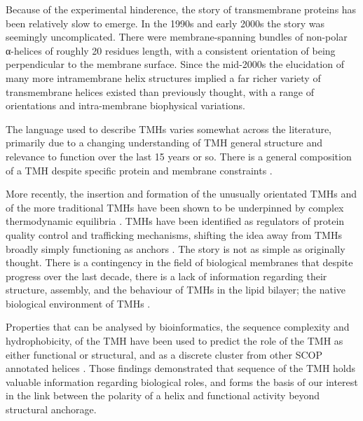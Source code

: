 \documentclass[12pt,PhD,twoside]{muthesis}
\begin{document}
Because of the experimental hinderence, the story of transmembrane proteins has been relatively slow to emerge. In the 1990s and early 2000s the story was seemingly uncomplicated. There were membrane-spanning bundles of non-polar α-helices of roughly 20 residues length, with a consistent orientation of being perpendicular to the membrane surface. Since the mid-2000s the elucidation of many more intramembrane helix structures implied a far richer variety of transmembrane helices existed than previously thought, with a range of orientations and intra-membrane biophysical variations.

The language used to describe TMHs varies somewhat across the literature, primarily due to a changing understanding of TMH general structure and relevance to function over the last 15 years or so. There is a general composition of a TMH despite specific protein and membrane constraints \cite{Sharpe2010}.

More recently, the insertion and formation of the unusually orientated TMHs and of the more traditional TMHs have been shown to be underpinned by complex thermodynamic equilibria \cite{Cymer2014}. TMHs have been identified as regulators of protein quality control and trafficking mechanisms, shifting the idea away from TMHs broadly simply functioning as anchors \cite{Hessa2011}. The story is not as simple as originally thought. There is a contingency in the field of biological membranes that despite progress over the last decade, there is a lack of information regarding their structure, assembly, and the behaviour of TMHs in the lipid bilayer; the native biological environment of TMHs \cite{Ladokhin2015, Cymer2014}.

Properties that can be analysed by bioinformatics, the sequence complexity and hydrophobicity, of the TMH have been used to predict the role of the TMH as either functional or structural, and as a discrete cluster from other SCOP annotated helices \cite{Wong2012}. Those findings demonstrated that sequence of the TMH holds valuable information regarding biological roles, and forms the basis of our interest in the link between the polarity of a helix and functional activity beyond structural anchorage.
\end{document}
